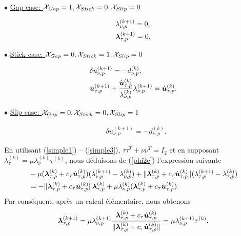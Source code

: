 \noindent {}\\

$\bullet$ \underline{Gap case: ${\cal X}_{Gap} =1, {\cal X}_{Stick} = 0, {\cal X}_{Slip} = 0$}

\begin{align}
&\lambda_{\nu, p}^{(k+1)}=0, \\
&\mbox{\boldmath{$\lambda$}}_{\tau, p}^{(k+1)}=0,
\end{align}

$\bullet$ \underline{Stick case: ${\cal X}_{Gap} =0, {\cal X}_{Stick} = 1, {\cal X}_{Slip} = 0$}

\begin{align}
&\delta u^{(k+1)}_{\nu,p} = -d^{(k)}_{\nu,p}, \\
& \dot{\mbox{\boldmath{$u$}}}_{\tau, p}^{(k+1)}+\frac{\dot{\mbox{\boldmath{$u$}}}_{\tau, p}^{(k)}}{\lambda_{\nu, p}^{(k)}}\lambda_{\nu, p}^{(k+1)} =\dot{\mbox{\boldmath{$u$}}}_{\tau, p}^{(k)}.
\end{align}

$\bullet$ \underline{Slip case: ${\cal X}_{Gap} =0, {\cal X}_{Stick} = 0, {\cal X}_{Slip} = 1$}

\begin{align}
&\delta u^{(k+1)}_{\nu,p} = -d^{(k)}_{\nu,p}.
\end{align}

En utilisant (\ref{simple1}) -- (\ref{simple3}), $\tau\tau^T+\nu\nu^T = I_2$ et en supposant $\lambda^{(k)}_\tau = \mu \lambda^{(k)}_\nu \tau^{(k)}$, nous déduisons de (\ref{phi2c}) l'expression suivante
\begin{align}
  &- \mu (\mbox{\boldmath{$\lambda$}}_{\tau, p}^{(k)}+c_\tau \dot{\mbox{\boldmath{$u$}}}_{\tau, p}^{(k)})(\lambda_{\nu, p}^{(k+1)}-\lambda_{\nu, p}^{(k)}) + \|\mbox{\boldmath{$\lambda$}}_{\tau, p}^{(k)}+c_\tau \dot{\mbox{\boldmath{$u$}}}_{\tau, p}^{(k)}\|(\lambda_{\tau, p}^{(k+1)}-\lambda_{\tau, p}^{(k)})\\
  &= -\|\mbox{\boldmath{$\lambda$}}_{\tau, p}^{(k)}+c_\tau \dot{\mbox{\boldmath{$u$}}}_{\tau, p}^{(k)}\|\mbox{\boldmath{$\lambda$}}_{\tau, p}^{(k)}+ \mu\lambda_{\nu, p}^{(k)} (\mbox{\boldmath{$\lambda$}}_{\tau, p}^{(k)}+c_\tau \dot{\mbox{\boldmath{$u$}}}_{\tau, p}^{(k)})\nonumber.
\end{align}
Par conséquent, après un calcul élémentaire, nous obtenons
\begin{align*}
  \mbox{\boldmath{$\lambda$}}_{\tau, p}^{(k+1)} = \mu \lambda_{\nu, p}^{(k+1)} \frac{\mbox{\boldmath{$\lambda$}}_{\tau, p}^{(k)}+c_\tau \dot{\mbox{\boldmath{$u$}}}_{\tau, p}^{(k)}}{\|\mbox{\boldmath{$\lambda$}}_{\tau, p}^{(k)}+c_\tau \dot{\mbox{\boldmath{$u$}}}_{\tau, p}^{(k)}\|} = \mu \lambda_{\nu, p}^{(k+1)} \tau^{(k)}\nonumber.
\end{align*}


